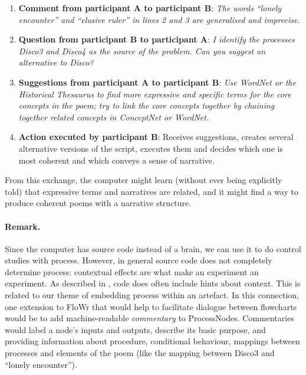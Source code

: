 \begin{enumerate}
\item \textbf{Comment from participant $\mathbf{A}$ to participant $\mathbf{B}$}: {\em The words ``lonely encounter'' and ``elusive ruler'' in lines 2 and 3 are generalised and imprecise}.
\item \textbf{Question from participant $\mathbf{B}$ to participant $\mathbf{A}$}: {\em I identify the processes {\em Disco3} and {\em Disco4} as the source of the problem. Can you suggest an alternative to Disco?} 
\item \textbf{Suggestions from participant $\mathbf{A}$ to participant $\mathbf{B}$}: {\em Use WordNet or the Historical Thesaurus to find more expressive and specific terms for the core concepts in the poem; try to link the core concepts together by chaining together related concepts in ConceptNet or WordNet.}%
\item \textbf{Action executed by participant $\mathbf{B}$}: Receives suggestions, creates several alternative versions of the script, executes them and decides which one is most coherent and which conveys a sense of narrative.
\end{enumerate}

\noindent From this exchange, the computer might learn (without ever being explicitly told) that expressive terms and narratives are related, and it might find a way to produce coherent poems with a narrative structure.

\paragraph{Remark.}
Since the computer has source code instead of a brain, we can use it to do control studies with process.  However, in general source code does not completely determine process: contextual effects are what make an experiment an experiment.  As described in \cite{cook2013mechanics}, code does often include hints about context.  This is related to our theme of embedding process within an artefact.
%
In this connection, one extension to FloWr that would help to facilitate dialogue between flowcharts would be to add machine-readable \emph{commentary} to ProcessNodes.  Commentaries would label a node's inputs and outputs, describe its basic purpose, and providing information about procedure, conditional behaviour, mappings between processes and elements of the poem (like the mapping between Disco3 and ``lonely encounter''). 

